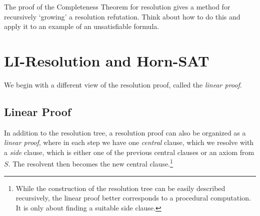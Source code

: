 \begin{exercise}
    The proof of the Completeness Theorem for resolution gives a method for recursively `growing' a resolution refutation. Think about how to do this and apply it to an example of an unsatisfiable formula.
\end{exercise}


\section{LI-Resolution and Horn-SAT}

We begin with a different view of the resolution proof, called the \emph{linear proof}.

\subsection{Linear Proof}

In addition to the resolution tree, a resolution proof can also be organized as a \emph{linear proof}, where in each step we have one \emph{central} clause, which we resolve with a \emph{side} clause, which is either one of the previous central clauses or an axiom from $S$. The resolvent then becomes the new central clause.\footnote{While the construction of the resolution tree can be easily described recursively, the linear proof better corresponds to a procedural computation. It is only about finding a suitable side clause.}

